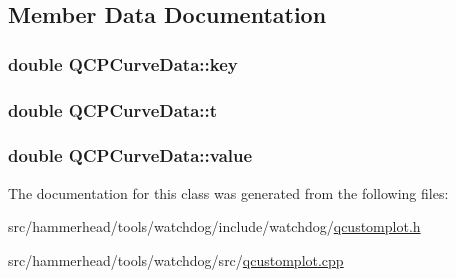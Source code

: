 \subsection{Member Data Documentation}
\subsubsection[{\texorpdfstring{key}{key}}]{\setlength{\rightskip}{0pt plus 5cm}double Q\+C\+P\+Curve\+Data\+::key}\hypertarget{classQCPCurveData_a8a4ec5f2b9a396149fd842e309701bd4}{}\label{classQCPCurveData_a8a4ec5f2b9a396149fd842e309701bd4}
\subsubsection[{\texorpdfstring{t}{t}}]{\setlength{\rightskip}{0pt plus 5cm}double Q\+C\+P\+Curve\+Data\+::t}\hypertarget{classQCPCurveData_aecc395525be28e9178a088793beb3ff3}{}\label{classQCPCurveData_aecc395525be28e9178a088793beb3ff3}
\subsubsection[{\texorpdfstring{value}{value}}]{\setlength{\rightskip}{0pt plus 5cm}double Q\+C\+P\+Curve\+Data\+::value}\hypertarget{classQCPCurveData_a72b39b8e1dbf7b45382ebd48419b6828}{}\label{classQCPCurveData_a72b39b8e1dbf7b45382ebd48419b6828}


The documentation for this class was generated from the following files\+:\begin{DoxyCompactItemize}
\item 
src/hammerhead/tools/watchdog/include/watchdog/\hyperlink{qcustomplot_8h}{qcustomplot.\+h}\item 
src/hammerhead/tools/watchdog/src/\hyperlink{qcustomplot_8cpp}{qcustomplot.\+cpp}\end{DoxyCompactItemize}
